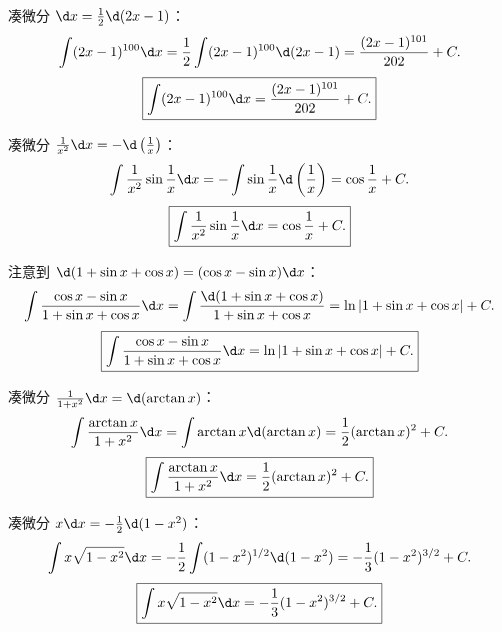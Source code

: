 \begin{solution}

    凑微分 $\d x = \frac{1}{2}\d(2x - 1)$：
    \begin{equation}
        \int (2x - 1)^{100} \d x = \frac{1}{2}\int (2x - 1)^{100} \d(2x - 1) = \frac{(2x - 1)^{101}}{202} + C.
    \end{equation}
    \begin{equation}
        \boxed{\int (2x - 1)^{100} \d x = \frac{(2x - 1)^{101}}{202} + C.}
    \end{equation}


    凑微分 $\frac{1}{x^2}\d x = -\d\left(\frac{1}{x}\right)$：
    \begin{equation}
        \int \frac{1}{x^2} \sin \frac{1}{x} \d x = -\int \sin \frac{1}{x} \d\left( \frac{1}{x} \right) = \cos \frac{1}{x} + C.
    \end{equation}
    \begin{equation}
        \boxed{\int \frac{1}{x^2} \sin \frac{1}{x} \d x = \cos \frac{1}{x} + C.}
    \end{equation}


    注意到 $\d(1 + \sin x + \cos x) = (\cos x - \sin x)\d x$：
    \begin{equation}
        \int \frac{\cos x - \sin x}{1 + \sin x + \cos x} \d x = \int \frac{\d(1 + \sin x + \cos x)}{1 + \sin x + \cos x} = \ln|1 + \sin x + \cos x| + C.
    \end{equation}
    \begin{equation}
        \boxed{\int \frac{\cos x - \sin x}{1 + \sin x + \cos x} \d x = \ln|1 + \sin x + \cos x| + C.}
    \end{equation}


    凑微分 $\frac{1}{1 + x^2}\d x = \d(\arctan x)$：
    \begin{equation}
        \int \frac{\arctan x}{1 + x^2} \d x = \int \arctan x \d(\arctan x) = \frac{1}{2}(\arctan x)^2 + C.
    \end{equation}
    \begin{equation}
        \boxed{\int \frac{\arctan x}{1 + x^2} \d x = \frac{1}{2}(\arctan x)^2 + C.}
    \end{equation}


    凑微分 $x\d x = -\frac{1}{2}\d(1 - x^2)$：
    \begin{equation}
        \int x\sqrt{1 - x^2} \d x = -\frac{1}{2}\int (1 - x^2)^{1/2} \d(1 - x^2) = -\frac{1}{3}(1 - x^2)^{3/2} + C.
    \end{equation}
    \begin{equation}
        \boxed{\int x\sqrt{1 - x^2} \d x = -\frac{1}{3}(1 - x^2)^{3/2} + C.}
    \end{equation}


\end{solution}

